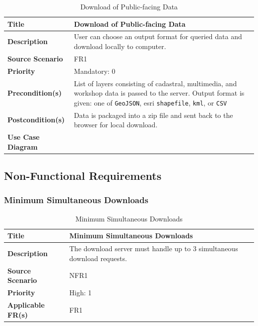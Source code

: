 \documentclass{article}
\begin{document}
\begin{table}[H]
	\caption{Download of Public-facing Data}
	\begin{tabularx}{\textwidth}{|l|X|}
		\hline
		\textbf{Title}            & Download of Public-facing Data            \\ \hline
		\textbf{Description}      & User can choose an output format for
		queried data and download locally to computer. \\ \hline
		\textbf{Source Scenario}  & FR1                                       \\ \hline
		\textbf{Priority}         & Mandatory: 0                              \\ \hline
		\textbf{Precondition(s)}  & List of layers consisting of cadastral,
		multimedia, and workshop data is passed to the server. Output format
		is given: one of \texttt{GeoJSON}, esri \texttt{shapefile}, \texttt{kml},
		or \texttt{CSV} \\ \hline
		\textbf{Postcondition(s)} & Data is packaged into a zip file and sent
		back to the browser for local download. \\ \hline
		\textbf{Use Case Diagram} &                                           \\  \hline
	\end{tabularx}
\end{table}

\subsection{Non-Functional Requirements}

\subsubsection{Minimum Simultaneous Downloads}

\begin{table}[H]
	\caption{Minimum Simultaneous Downloads}
	\begin{tabularx}{\textwidth}{|l|X|}
		\hline
		\textbf{Title}            & Minimum Simultaneous Downloads          \\ \hline
		\textbf{Description}      & The download server must handle up to 3
		simultaneous download requests. \\ \hline
		\textbf{Source Scenario}  & NFR1                                    \\ \hline
		\textbf{Priority}         & High: 1                                 \\ \hline
		\textbf{Applicable FR(s)} & FR1                                     \\ \hline
	\end{tabularx}
\end{table}
\end{document}
